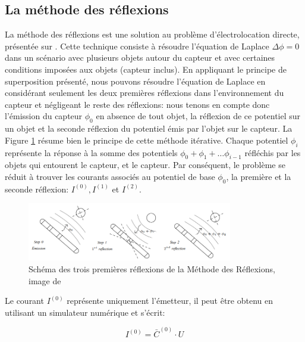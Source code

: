 \subsection{La méthode des réflexions}
La méthode des réflexions est une solution au problème d'électrolocation directe, présentée sur \cite{Boyer2012}. Cette technique consiste à résoudre l'équation de Laplace $\Delta\phi = 0$ dans un scénario avec plusieurs objets autour du capteur et avec certaines conditions imposées aux objets (capteur inclus). En appliquant le principe de superposition présenté, nous pouvons résoudre l'équation de Laplace en considérant seulement les deux premières réflexions dans l'environnement du capteur et négligeant le reste des réflexions: nous tenons en compte donc l'émission du capteur $\phi_0$ en absence de tout objet, la réflexion de ce potentiel sur un objet et la seconde réflexion du potentiel émis par l'objet sur le capteur. La Figure \ref{fig:reflexions} résume bien le principe de cette méthode itérative. Chaque potentiel $\phi_i$ représente la réponse à la somme des potentiels $\phi_0 + \phi_1 + \dots \phi_{i-1}$ réfléchis par les objets qui entourent le capteur, et le capteur. Par conséquent, le problème se réduit à trouver les courants associés au potentiel de base $\phi_0$, la première et la seconde réflexion: $I^{(0)}, I^{(1)}$ et $I^{(2)}$. 
\clearpage 
\begin{figure}[h!]
    \centering
    \includegraphics[width=0.8\textwidth]{doc/img/reflexions.png}
    \caption{Schéma des trois premières réflexions de la Méthode des Réflexions, image de \cite{Boyer2012}}
    \label{fig:reflexions}
\end{figure}

Le courant $I^{(0)}$ représente uniquement l'émetteur, il peut être obtenu en utilisant un simulateur numérique et s'écrit: 

\begin{equation}
    I^{(0)} = \bar{C}^{(0)} \cdot U
\end{equation}

